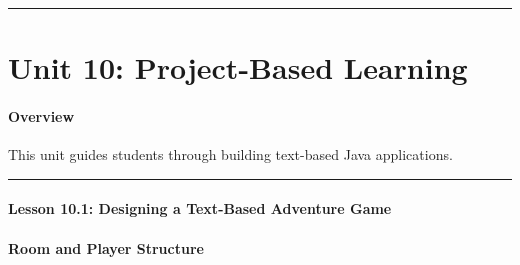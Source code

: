 \documentclass[
  justified,
  openright,
]{tufte-book}
\let\subsection\paragraph
\let\paragraph\paragraph
\let\subsection\paragraph
\let\paragraph\paragraph
\begin{document}
\begin{center}\rule{0.5\linewidth}{0.5pt}\end{center}

\section{Unit 10: Project-Based
Learning}\label{unit-10-project-based-learning-2}

\subsection{Overview}\label{overview-24}

This unit guides students through building text-based Java applications.

\begin{center}\rule{0.5\linewidth}{0.5pt}\end{center}

\subsection{Lesson 10.1: Designing a Text-Based Adventure
Game}\label{lesson-10.1-designing-a-text-based-adventure-game}

\subsection{Room and Player
Structure}\label{room-and-player-structure}
\end{document}
